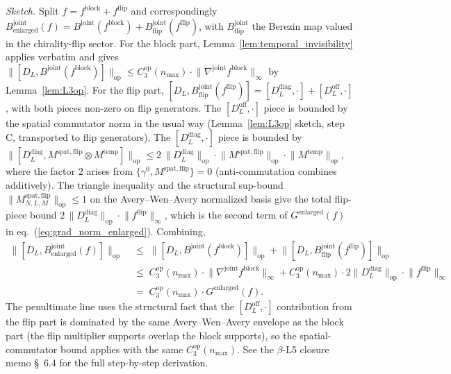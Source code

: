 \documentclass[11pt,a4paper]{article}
\theoremstyle{plain}
\theoremstyle{definition}
\newcommand{\nmax}{n_{\max}}
\newcommand{\opnorm}[1]{\lVert #1 \rVert_{\mathrm{op}}}
\newcommand{\norm}[1]{\lVert #1 \rVert}
\newcommand{\DL}{D_{L}}
\newcommand{\Ddiag}{D_{L}^{\mathrm{diag}}}
\newcommand{\Doff}{D_{L}^{\mathrm{off}}}
\newcommand{\Bjoint}{B^{\mathrm{joint}}}
\newcommand{\Cthreeop}{C_{3}^{\mathrm{op}}}
\newcommand{\spat}{\mathrm{spat}}
\newcommand{\temp}{\mathrm{temp}}
\begin{document}
\emph{Sketch.} Split $f = f^{\mathrm{block}} + f^{\mathrm{flip}}$ and
correspondingly $\Bjoint_{\mathrm{enlarged}}(f) = \Bjoint(f^{\mathrm{block}})
+ \Bjoint_{\mathrm{flip}}(f^{\mathrm{flip}})$, with
$\Bjoint_{\mathrm{flip}}$ the Berezin map valued in the chirality-flip
sector. For the block part, Lemma~\ref{lem:temporal_invisibility}
applies verbatim and gives $\opnorm{[\DL, \Bjoint(f^{\mathrm{block}})]}
\le \Cthreeop(\nmax) \cdot \norm{\nabla^{\mathrm{joint}} f^{\mathrm{block}}}_{\infty}$
by Lemma~\ref{lem:L3op}. For the flip part,
$[\DL, \Bjoint_{\mathrm{flip}}(f^{\mathrm{flip}})] = [\Ddiag, \cdot] +
[\Doff, \cdot]$, with both pieces non-zero on flip generators. The
$[\Doff, \cdot]$ piece is bounded by the spatial commutator norm in
the usual way (Lemma~\ref{lem:L3op} sketch, step C, transported to
flip generators). The $[\Ddiag, \cdot]$ piece is bounded by
$\opnorm{[\Ddiag, M^{\spat,\mathrm{flip}} \otimes M^{\temp}]}
\le 2\,\opnorm{\Ddiag} \cdot \opnorm{M^{\spat,\mathrm{flip}}}
\cdot \opnorm{M^{\temp}}$, where the factor $2$ arises from
$\{\gamma^{0}, M^{\spat,\mathrm{flip}}\} = 0$ (anti-commutation
combines additively). The triangle inequality and the structural
sup-bound $\opnorm{M^{\spat,\mathrm{flip}}_{N, L, M}} \le 1$ on the
Avery--Wen--Avery normalized basis give the total flip-piece bound
$2\,\opnorm{\Ddiag} \cdot \norm{f^{\mathrm{flip}}}_{\infty}$, which is
the second term of $G^{\mathrm{enlarged}}(f)$ in
eq.~(\ref{eq:grad_norm_enlarged}). Combining,
\begin{align*}
   \opnorm{[\DL, \Bjoint_{\mathrm{enlarged}}(f)]}
   &\;\le\; \opnorm{[\DL, \Bjoint(f^{\mathrm{block}})]}
   + \opnorm{[\DL, \Bjoint_{\mathrm{flip}}(f^{\mathrm{flip}})]} \\
   &\;\le\; \Cthreeop(\nmax) \cdot \norm{\nabla^{\mathrm{joint}} f^{\mathrm{block}}}_{\infty}
   + \Cthreeop(\nmax) \cdot 2\opnorm{\Ddiag} \cdot \norm{f^{\mathrm{flip}}}_{\infty} \\
   &\;=\; \Cthreeop(\nmax) \cdot G^{\mathrm{enlarged}}(f).
\end{align*}
The penultimate line uses the structural fact that the $[\Doff, \cdot]$
contribution from the flip part is dominated by the same Avery--Wen--Avery
envelope as the block part (the flip multiplier supports overlap the
block supports), so the spatial-commutator bound applies with the same
$\Cthreeop(\nmax)$. See the $\beta$-L5 closure memo \S~6.4 for the
full step-by-step derivation.
\end{document}
